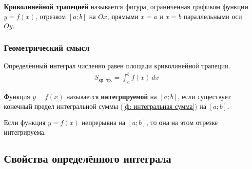 \begin{definition}
    \textbf{Криволинейной трапецией} называется фигура, ограниченная графиком функции $y=f(x)$, отрезком $[a;b]$ на $Ox$, прямыми $x = a$ и $x = b$ параллельными оси $Oy$.
\end{definition}

\subsubsection{Геометрический смысл}


\begin{figure}[h]
    \centering
\end{figure}

Определённый интеграл численно равен площади криволинейной трапеции.
\begin{gather*}
    S_{\text{кр. тр.}} = \int_{a}^{b} f(x)\, dx
\end{gather*}

\begin{definition}
    Функция $y=f(x)$ называется \textbf{интегрируемой} на $[a;b]$, если существует конечный предел интегральной суммы (\ref{ф: интегральная сумма}) на $[a;b]$.
\end{definition}

\begin{theorem}
    Если функция $y=f(x)$ непрерывна на $[a;b]$, то она на этом отрезке интегрируема.
\end{theorem}

\subsection{Свойства определённого интеграла}

